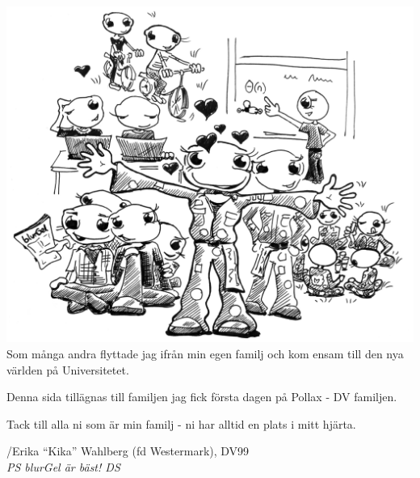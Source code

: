 \documentclass[a6paper,fontsize=10pt,twoside,open=right]{scrbook}
\begin{document}
\newpage

\vspace{15pt}

\vspace{15pt}

\newpage

\newpage

\newpage
\null
\vspace{5pt}
\includegraphics[keepaspectratio,width=\textwidth]{elements/kika.jpg}
\vspace{10pt}\\ Som många andra flyttade jag ifrån min egen familj och
kom ensam till den nya världen på Universitetet.\par
\vspace{10pt}
Denna sida tillägnas till familjen jag fick första dagen på Pollax -
DV familjen.\par
\vspace{10pt}
Tack till alla ni som är min familj - ni har alltid en plats i mitt
hjärta.\par
\vspace{10pt}
/Erika ``Kika'' Wahlberg (fd Westermark),
DV99\\{\footnotesize\textit{PS blurGel är bäst! DS}}
\newpage

\vspace{15pt}

\newpage

\newpage

\newpage

\vspace{15pt}

\newpage

\end{document}
